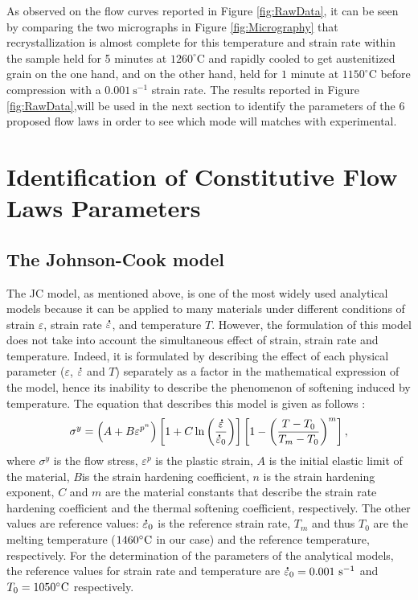 \documentclass[twoside,english,1p,final,sort&compress]{elsarticle}
\theoremstyle{plain}
\DeclareRobustCommand{\mdot}[1]{\accentset{\mbox{\bfseries .}}{#1}}
\DeclareRobustCommand{\ps}{\text{s}^{-1}}
\begin{document}
As observed on the flow curves reported in Figure \ref{fig:RawData}, it can be seen by comparing the two micrographs in Figure \ref{fig:Micrography} that recrystallization is almost complete for this temperature and strain rate within the sample held for 5 minutes at $1260^\circ$C and rapidly cooled to get austenitized grain on the one hand, and on the other hand, held for $1$ minute at $1150^\circ$C before compression with a $0.001~\text{s}^{-1}$ strain rate.
The results reported in Figure \ref{fig:RawData},will be used in the next section to identify the parameters of the $6$  proposed flow laws in order to see which mode will matches with experimental.

\section{Identification of Constitutive Flow Laws Parameters\label{sec:ConstLaws}}
\subsection{The Johnson-Cook model\label{sec:JC}}

The JC model, as mentioned above, is one of the most widely used analytical models because it can be applied to many materials under different conditions of strain $\varepsilon$, strain rate $\mdot\varepsilon$, and temperature $T$.
However, the formulation of this model does not take into account the simultaneous effect of strain, strain rate and temperature.
Indeed, it is formulated by describing the effect of each physical parameter ($\varepsilon$, $\mdot\varepsilon$ and $T$) separately as a factor in the mathematical expression of the model, hence its inability to describe the phenomenon of softening induced by temperature.
The equation that describes this model is given as follows \cite{Johnson-1983}:
\begin{equation}
\sigma^y=\left(A+B\varepsilon^{p^{n}}\right) \left[1+C\ln\left(\frac{\mdot\varepsilon}{\mdot\varepsilon_0}\right)\right] \left[1-\left(\frac{T-T_0}{T_m-T_0}\right)^{m}\right],\label{eq:Johnson-Cook}
\end{equation}
where $\sigma^y$ is the flow stress, $\varepsilon^p$ is the plastic strain, $A$ is the initial elastic limit of the material, $B$is the strain hardening coefficient, $n$ is the strain hardening exponent, $C$ and $m$ are the material constants that describe the strain rate hardening coefficient and the thermal softening coefficient, respectively.
The other values are reference values: $\mdot\varepsilon_0$ is the reference strain rate, $T_m$ and thus $T_0$ are the melting temperature ($1460\celsius$ in our case) and the reference temperature, respectively.
For the determination of the parameters of the analytical models, the reference values for strain rate and temperature are $\mdot\varepsilon_0=0.001~\ps$ and $T_0=1050\celsius$ respectively.
\end{document}
